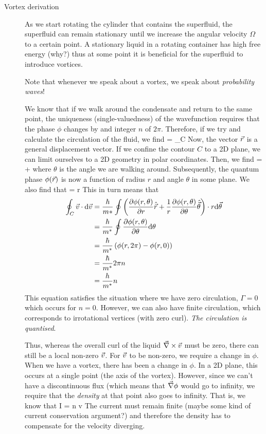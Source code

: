 \begin{description}
\item[Vortex derivation] As we start rotating the cylinder that contains the superfluid, the superfluid can remain stationary until we increase the angular velocity $\Omega$ to a certain point. A stationary liquid in a rotating container has high free energy (why?) thus at some point it is beneficial for the superfluid to introduce vortices. 

Note that whenever we speak about a vortex, we speak about \emph{probability waves}! 

We know that if we walk around the condensate and return to the same point, the uniqueness (single-valuedness) of the wavefunction requires that the phase $\phi$ changes by and integer $n $ of $2\pi$. Therefore, if we try and calculate the circulation of the fluid, we find
\beq
\Gamma = \oint_C  \cdot \intd {} 
\eeq
Now, the vector $\vec{r}$ is a general displacement vector. If we confine the contour $C$ to a 2D plane, we can limit ourselves to a 2D geometry in polar coordinates. Then, we find
\beq
\vv{\nabla} =  +  \frac{\p}{\p \theta}
\eeq
where $\theta$ is the angle we are walking around. Subsequently, the quantum phase $\phi(\vec{r})$ is now a function of radius $r$ and angle $\theta$ in some plane. We also find that 
\beq
\intd {} = r \intd \theta \vhat{\theta}
\eeq
This in turn means that 
\begin{align}
\oint_C \vec{v} \cdot \mathrm{d} \vec{v} &= \frac{\hbar}{m*} \oint \left( \frac{\partial \phi(r, \theta)}{\partial r} \hat{\vec{r}}+ \frac{1}{r} \frac{\partial \phi(r ,\theta)}{\partial \theta}\hat{\vec{\theta}} \right) \cdot r \mathrm{d} \vec{\theta}  \\
&= \frac{\hbar}{m^*} \oint \frac{\partial \phi(r, \theta)}{\partial \theta} \mathrm{d} \theta \\
&= \frac{\hbar}{m^*} \left( \phi(r, 2\pi) - \phi(r, 0) \right) \\
&= \frac{\hbar}{m^*} 2\pi n \\
&= \frac{h}{m^*}n
\end{align}
This equation satisfies the situation where we have zero circulation, $\Gamma = 0$ which occurs for $n = 0$. However, we can also have finite circulation, which corresponds to irrotational vertices (with zero curl). \emph{The circulation is quantised}. 


Thus, whereas the overall curl of the liquid $\vec{\nabla} \times \vec{v} 
 $ must be zero, there can still be a local non-zero $\vec{v}$. For $\vec{v}$ to be non-zero, we require a change in $\phi$. When we have a vortex, there has been a change in $\phi$. In a 2D plane, this occurs at a single point (the axis of the vortex). However, since we can't have a discontinuous flux (which means that $\vec{\nabla} \phi$ would go to infinity, we require that the \emph{density} at that point also goes to infinity. That is, we know that 
\beq
I = n v
\eeq
The current must remain finite (maybe some kind of current conservation argument?) and therefore the density has to compensate for the velocity diverging. 



\end{description}
